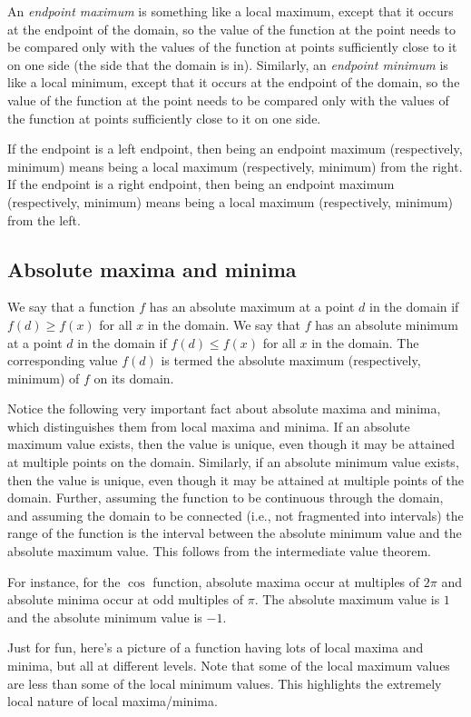 \documentclass[10pt]{amsart}
\begin{document}
An {\em endpoint maximum} is something like a local maximum, except
that it occurs at the endpoint of the domain, so the value of the
function at the point needs to be compared only with the values of the
function at points sufficiently close to it on one side (the side that
the domain is in). Similarly, an {\em endpoint minimum} is like a
local minimum, except that it occurs at the endpoint of the domain, so
the value of the function at the point needs to be compared only with
the values of the function at points sufficiently close to it on one
side.

If the endpoint is a left endpoint, then being an endpoint maximum
(respectively, minimum) means being a local maximum (respectively,
minimum) from the right. If the endpoint is a right endpoint, then
being an endpoint maximum (respectively, minimum) means being a local
maximum (respectively, minimum) from the left.

\subsection{Absolute maxima and minima}

We say that a function $f$ has an absolute maximum at a point $d$ in
the domain if $f(d) \ge f(x)$ for all $x$ in the domain. We say that
$f$ has an absolute minimum at a point $d$ in the domain if $f(d) \le
f(x)$ for all $x$ in the domain. The corresponding value $f(d)$ is
termed the absolute maximum (respectively, minimum) of $f$ on its
domain.

Notice the following very important fact about absolute maxima and
minima, which distinguishes them from local maxima and minima. If an
absolute maximum value exists, then the value is unique, even though
it may be attained at multiple points on the domain. Similarly, if an
absolute minimum value exists, then the value is unique, even though
it may be attained at multiple points of the domain. Further, assuming
the function to be continuous through the domain, and assuming the
domain to be connected (i.e., not fragmented into intervals) the range
of the function is the interval between the absolute minimum value and
the absolute maximum value. This follows from the intermediate value
theorem.

For instance, for the $\cos$ function, absolute maxima occur at
multiples of $2\pi$ and absolute minima occur at odd multiples of
$\pi$. The absolute maximum value is $1$ and the absolute minimum
value is $-1$.

Just for fun, here's a picture of a function having lots of local
maxima and minima, but all at different levels. Note that some of the
local maximum values are less than some of the local minimum
values. This highlights the extremely local nature of local maxima/minima.
\end{document}
